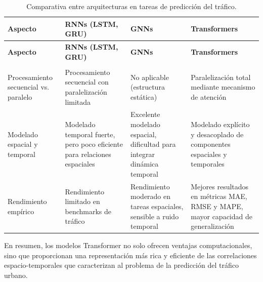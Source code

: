 \begin{longtable}{>{\raggedright\arraybackslash}p{3cm} >{\raggedright\arraybackslash}p{3.5cm} >{\raggedright\arraybackslash}p{3.5cm} >{\raggedright\arraybackslash}p{4cm}}
	\caption{Comparativa entre arquitecturas en tareas de predicción del tráfico.} \label{tab:comparativa-modelos} \\
	\toprule
	\textbf{Aspecto} &
	\textbf{RNNs (LSTM, GRU)} &
	\textbf{GNNs} &
	\textbf{Transformers} \\
	\midrule
	\endfirsthead
	
	\toprule
	\textbf{Aspecto} &
	\textbf{RNNs (LSTM, GRU)} &
	\textbf{GNNs} &
	\textbf{Transformers} \\
	\midrule
	\endhead
	
	\midrule
	\multicolumn{4}{r}{\textit{Continúa en la siguiente página}} \\
	\midrule
	\endfoot
	
	\bottomrule
	\endlastfoot
	
	Procesamiento secuencial vs. paralelo &
	Procesamiento secuencial con paralelización limitada &
	No aplicable (estructura estática) &
	Paralelización total mediante mecanismo de atención \\
	
	Modelado espacial y temporal &
	Modelado temporal fuerte, pero poco eficiente para relaciones espaciales &
	Excelente modelado espacial, dificultad para integrar dinámica temporal &
	Modelado explícito y desacoplado de componentes espaciales y temporales \\
	
	Rendimiento empírico &
	Rendimiento limitado en benchmarks de tráfico &
	Rendimiento moderado en tareas espaciales, sensible a ruido temporal &
	Mejores resultados en métricas MAE, RMSE y MAPE, mayor capacidad de generalización \\
	
\end{longtable}

En resumen, los modelos Transformer no solo ofrecen ventajas computacionales, sino que proporcionan una representación más rica y eficiente de las correlaciones espacio-temporales que caracterizan al problema de la predicción del tráfico urbano. 


